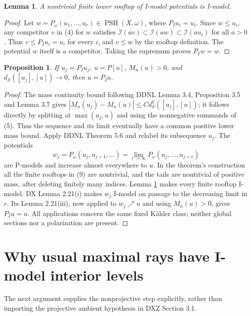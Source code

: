 \documentclass[11pt]{article}
\newtheorem{lemma}[theorem]{Lemma}
\newtheorem{proposition}[theorem]{Proposition}
\newcommand{\PSH}{\operatorname{PSH}}
\newcommand{\MI}{\mathcal I}
\newcommand{\ds}{d_{\mathcal S}}
\begin{document}
\begin{lemma}\label{roof}
A nontrivial finite lower rooftop of I-model potentials is I-model.
\end{lemma}
\begin{proof}
Let $w=P_\omega(u_1,\ldots,u_r)\in\PSH(X,\omega)$, where
$P_Iu_i=u_i$. Since $w\le u_i$, any competitor $v$ in (4) for $w$
satisfies $\MI(av)\subset\MI(aw)\subset\MI(au_i)$ for all $a>0$.
Thus $v\le P_Iu_i=u_i$ for every $i$, and $v\le w$ by the
rooftop definition. The potential $w$ itself is a competitor.
Taking the supremum proves $P_Iw=w$.
\end{proof}

\begin{proposition}\label{closed}
If $u_j=P_Iu_j$, $u=P[u]$, $M_n(u)>0$, and
$\ds([u_j],[u])\to0$, then $u=P_Iu$.
\end{proposition}
\begin{proof}
The mass continuity bound following DDNL Lemma 3.4, Proposition 3.5
and Lemma 3.7 gives
$|M_n(u_j)-M_n(u)|\le C\ds^V([u_j],[u])$; it follows directly by
splitting at $\max(u_j,u)$ and using the nonnegative summands of
(5). Thus the sequence and its limit eventually have a common
positive lower mass bound. Apply DDNL Theorem 5.6 and relabel its
subsequence $u_j$. The potentials
\[
 w_j=P_\omega(u_j,u_{j+1},\ldots)
       =\lim_{r\to\infty}P_\omega(u_j,\ldots,u_{j+r})
                                                               \tag{9}
\]
are P-models and increase almost everywhere to $u$. In the theorem's
construction all the finite rooftops in (9) are nontrivial, and the
tails are nontrivial of positive mass, after deleting finitely many
indices. Lemma \ref{roof} makes every finite rooftop I-model.
DX Lemma 2.21(i) makes $w_j$ I-model on passage to the decreasing
limit in $r$. Its Lemma 2.21(iii), now applied to $w_j\nearrow u$
and using $M_n(u)>0$, gives $P_Iu=u$. All applications concern the
same fixed K\"ahler class; neither global sections nor a polarization
are present.
\end{proof}

\section{Why usual maximal rays have I-model interior levels}
The next argument supplies the nonprojective step explicitly, rather
than importing the projective ambient hypothesis in DXZ Section 3.1.
\end{document}
